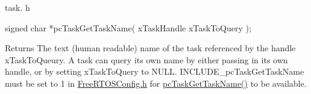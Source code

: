 task. h 
\begin{DoxyPre}signed char *pcTaskGetTaskName( xTaskHandle xTaskToQuery );\end{DoxyPre}


\begin{DoxyReturn}{Returns}
The text (human readable) name of the task referenced by the handle x\-Task\-To\-Queury. A task can query its own name by either passing in its own handle, or by setting x\-Task\-To\-Query to N\-U\-L\-L. I\-N\-C\-L\-U\-D\-E\-\_\-pc\-Task\-Get\-Task\-Name must be set to 1 in \hyperlink{_free_r_t_o_s_config_8h}{Free\-R\-T\-O\-S\-Config.\-h} for \hyperlink{task_8h_a9f1840f3a1d2527e76d301fc1a6aba37}{pc\-Task\-Get\-Task\-Name()} to be available. 
\end{DoxyReturn}
